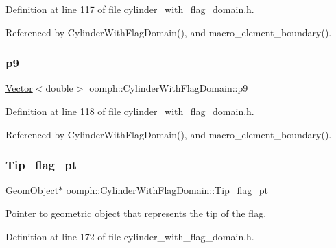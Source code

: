 Definition at line 117 of file cylinder\+\_\+with\+\_\+flag\+\_\+domain.\+h.



Referenced by Cylinder\+With\+Flag\+Domain(), and macro\+\_\+element\+\_\+boundary().

\mbox{\label{classoomph_1_1CylinderWithFlagDomain_a8ff949c600451d8cc9e53fc9b204dd79}} 
\subsubsection{\texorpdfstring{p9}{p9}}
{\footnotesize\ttfamily \hyperlink{classoomph_1_1Vector}{Vector}$<$double$>$ oomph\+::\+Cylinder\+With\+Flag\+Domain\+::p9\hspace{0.3cm}{\ttfamily [private]}}



Definition at line 118 of file cylinder\+\_\+with\+\_\+flag\+\_\+domain.\+h.



Referenced by Cylinder\+With\+Flag\+Domain(), and macro\+\_\+element\+\_\+boundary().

\mbox{\label{classoomph_1_1CylinderWithFlagDomain_a2926eb3a4c171fbc924115f7dfd211a4}} 
\subsubsection{\texorpdfstring{Tip\+\_\+flag\+\_\+pt}{Tip\_flag\_pt}}
{\footnotesize\ttfamily \hyperlink{classoomph_1_1GeomObject}{Geom\+Object}$\ast$ oomph\+::\+Cylinder\+With\+Flag\+Domain\+::\+Tip\+\_\+flag\+\_\+pt\hspace{0.3cm}{\ttfamily [private]}}



Pointer to geometric object that represents the tip of the flag. 



Definition at line 172 of file cylinder\+\_\+with\+\_\+flag\+\_\+domain.\+h.



